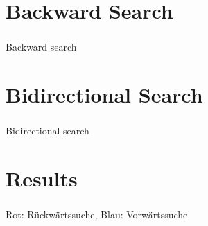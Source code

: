 \documentclass{beamer}
\begin{document}
\section{Backward Search}

\begin{frame}
    \frametitle{\insertsection}

    Backward search

\end{frame}

\begin{frame}
    \frametitle{\insertsection}

    \centering

    

\end{frame}

\section{Bidirectional Search}

\begin{frame}
    \frametitle{\insertsection}

    Bidirectional search

\end{frame}

\section{Results}

\begin{frame}
    \frametitle{\insertsection}

    \centering

    {\color{red} Rot: Rückwärtssuche},
    {\color{blue} Blau: Vorwärtssuche}

    

\end{frame}
\end{document}
